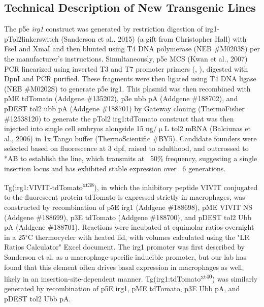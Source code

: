 \citep{Ma2017}


\subsection{Technical Description of New Transgenic Lines}

The p5e \textit{irg1} construct was generated by restriction digestion of irg1-pTol2linkerswitch (Sanderson et al., 2015) (a gift from Christopher Hall) with FseI and XmaI and then blunted using T4 DNA polymerase (NEB \#M0203S) per the manufacturer's instructions. Simultaneously, p5e MCS (Kwan et al., 2007) PCR linearized using inverted T3 and T7 promoter primers (, ), digested with DpnI and PCR purified. These fragments were then ligated using T4 DNA ligase (NEB \#M0202S) to generate p5e irg1. This plasmid was then recombined with pME tdTomato (Addgene \#135202), p3e ubb pA (Addgene \#188702), and pDEST tol2 ubb pA (Addgene \#188701) by Gateway cloning (ThermoFisher \#12538120) to generate the pTol2 irg1:tdTomato construct that was then injected into single cell embryos alongside 15 ng/$\upmu$L tol2 mRNA (Balciunas et al., 2006) in 1x Tango buffer (ThermoScientific \#BY5). Candidate founders were selected based on fluorescence at 3 dpf, raised to adulthood, and outcrossed to *AB to establish the line, which transmits at ~50\% frequency, suggesting a single insertion locus and has exhibited stable expression over ~6 generations.

Tg(irg1:VIVIT-tdTomato\textsuperscript{xt38}), in which the inhibitory peptide VIVIT conjugated to the fluorescent protein tdTomato is expressed strictly in macrophages, was constructed by recombination of p5E irg1 (Addgene \#188698), pME VIVIT NS (Addgene \#188699), p3E tdTomato (Addgene \#188700), and pDEST tol2 Ubb pA (Addgene \#188701). Reactions were incubated at equimolar ratios overnight in a 25$^{\circ}$C thermocycler with heated lid, with volumes calculated using the "LR Ratios Calculator" Excel document. The irg1 promoter was first described by Sanderson et al. as a macrophage-specific inducible promoter, but our lab has found that this element often drives basal expression in macrophages as well, likely in an insertion-site-dependent manner. Tg(irg1:tdTomato\textsuperscript{xt40}) was similarly generated by recombination of p5E irg1, pME tdTomato, p3E Ubb pA, and pDEST tol2 Ubb pA. 

